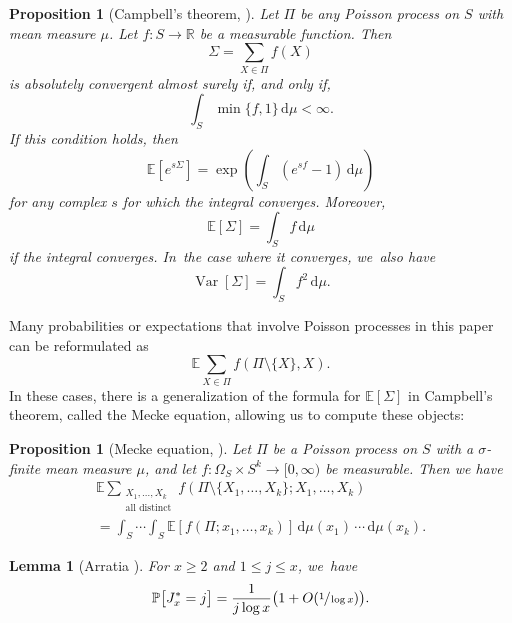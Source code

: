 \documentclass[10pt,a4paper]{article}
\newcommand{\RR}{\mathbb{R}}
\newcommand{\PP}{\mathbb{P}}
\newcommand{\EE}{\mathbb{E}}
\newcommand{\bigoo}[1]{O\!\left(#1 \right)}
\newcommand{\riemint}[4]{\int_{#1}^{#2}\! #3 \, \mathrm{d}#4}
\newcommand{\bg}{\big}
\DeclareMathOperator{\vard}{Var}
\theoremstyle{plain}
\newtheorem{lem}[cor]{Lemma}
\newtheorem{prop}[cor]{Proposition}
\theoremstyle{definition}
\begin{document}
\begin{prop}[Campbell's theorem, {\cite[\S3.2]{Kingman93}}]
\label{prel:campbell}
Let $\Pi$ be any Poisson process on $S$ with mean measure $\mu$. Let $f\colon S \to \RR$ be a measurable function. Then
\[
\Sigma = \sum_{X \in \Pi} f(X)
\]
is absolutely convergent almost surely if, and only if,
\[
\riemint{S}{}{\min\{f, 1\}}{\mu} < \infty.
\]
If this condition holds, then
\[
\EE[e^{s\Sigma}] = \exp\left(\riemint{S}{}{(e^{sf} - 1)}{\mu}\right)
\]
for any complex $s$ for which the integral converges. Moreover,
\[
\EE[\Sigma] = \riemint{S}{}{f}{\mu}
\]
if the integral converges. In~the case where it converges, we~also have
\[
\vard[\Sigma] = \riemint{S}{}{f^2}{\mu}.
\]
\end{prop}

Many probabilities or expectations that involve Poisson processes in this paper can be reformulated as
\[
\EE \sum_{X \in \Pi} f(\Pi\setminus \{X\}, X).
\]
In these cases, there is a generalization of the formula for $\EE[\Sigma]$ in Campbell's theorem, called the Mecke equation, allowing us to compute these objects:

\begin{prop}[Mecke equation, {\cite[Th.\,4.5]{LastPenrose18}}]
\label{prel:mecke}
Let $\Pi$ be a Poisson process on $S$ with a $\sigma$-finite mean measure $\mu$, and let $f: \Omega_S \times S^k \to [0, \infty)$ be measurable. Then we have
\begin{multline*}
\EE \sum_{\substack{X_1, \ldots, X_k \\ \text{all distinct}}} f(\Pi\setminus \{X_1, \ldots, X_k\}; X_1, \ldots, X_k) \\[-10pt]
= \int_S \cdots \int_S \EE[f(\Pi; x_1, \ldots, x_k)] \, \mathrm d\mu(x_1)\, \cdots\, \mathrm d\mu(x_k).
\end{multline*}
\end{prop}

\begin{lem}[Arratia \cite{Arratia02}]
\label{lem:probaj}
For $x \ge 2$ and $1 \le j \le x$, we~have
\[
\PP\bg[J_x^*=j\bg] = \frac{1}{j\log x}\bigl(1+\bigoo{\sfrac{1}{\log x}} \bigr).
\]
\end{lem}
\end{document}
